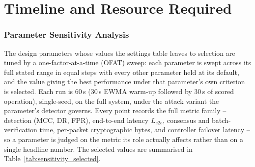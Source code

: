 \documentclass[12pt, a4paper]{report}
\begin{document}
{{%



\chapter{Timeline and Resource Required}

\subsection{Parameter Sensitivity Analysis}
\label{sec:sensitivity}
The design parameters whose values the settings table leaves to selection are
tuned by a one-factor-at-a-time (OFAT) sweep: each parameter is swept across its
full stated range in equal steps with every other parameter held at its default,
and the value giving the best performance under that parameter's own criterion is
selected. Each run is 60\,s (30\,s \ac{EWMA} warm-up followed by 30\,s of scored
operation), single-seed, on the full system, under the attack variant the
parameter's detector governs. Every point records the full metric family --
detection (\ac{MCC}, \ac{DR}, \ac{FPR}), end-to-end latency $L_{e2e}$, consensus
and batch-verification time, per-packet cryptographic bytes, and controller
failover latency -- so a parameter is judged on the metric its role actually
affects rather than on a single headline number. The selected values are
summarised in Table~\ref{tab:sensitivity_selected}.

}}
\end{document}
